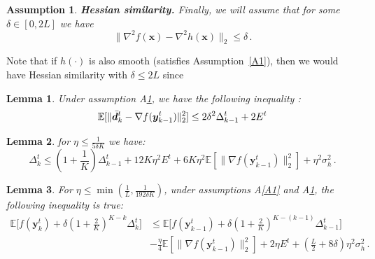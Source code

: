 \documentclass[10pt,a4paper]{amsart}
\newtheorem{assumption}{Assumption}
\newtheorem{lemma}{Lemma}
\newcommand{\E}{\mathbb{E}}
\newcommand{\norm}[1]{\|#1\|_2}
\def\vd{{\bm{d}}}
\def\vx{{\bm{x}}}
\def\vy{{\bm{y}}}
\begin{document}
\begin{assumption}\label{A3}
\textbf{Hessian similarity.} Finally, we will assume that for some $\delta \in [0,2L]$ we have
    \begin{equation*}\label{eqn:hessian-sim}
        \norm{\nabla^2 f(\vx) - \nabla^2 h(\vx)} \leq \delta \,.
    \end{equation*}    
\end{assumption} Note that if $h(\cdot)$ is also smooth (satisfies Assumption~\ref{A1}), then we would have Hessian similarity with $\delta \leq 2L$ since

\begin{lemma}\label{lemmaVD}
Under assumption A\ref{A3}, we have the following inequality :
\[\E[\norm{\Bar{\vd}^t_k - \nabla f(\vy^t_{k-1})}^2] \leq 2\delta^2 \Delta^t_{k-1} + 2 E^t\]
\end{lemma}

\begin{lemma}\label{lemmaDeltaTK} for $\eta\leq \frac{1}{5\delta K}$ we have:
$$\Delta^t_k \leq (1+\frac{1}{K})\Delta^t_{k-1} + 12 K\eta^2 E^t + 6K\eta^2\E[\norm{\nabla f(\vy^t_{k-1})}^2] + \eta^2 \sigma_h^2\,.$$
\end{lemma}

\begin{lemma}\label{POneStep}
For $\eta \leq \min(\frac{1}{L}, \frac{1}{192\delta K})$, under assumptions A\ref{A1} and A\ref{A3}, the following inequality is true:
\begin{align*}
   \E\big[f(\vy^t_k) + \delta (1 + \frac{2}{K})^{K-k}\Delta^t_k\big] &\leq \E\big[f(\vy^t_{k-1}) + \delta (1 + \frac{2}{K})^{K-(k-1)}\Delta^t_{k-1}\big] \\&- \frac{\eta}{4}\E[\norm{\nabla f(\vy^t_{k-1})}^2] + 2 \eta E^t + (\frac{L}{2}+8\delta)\eta^2\sigma_h^2\, . 
\end{align*}
\end{lemma}
\end{document}
